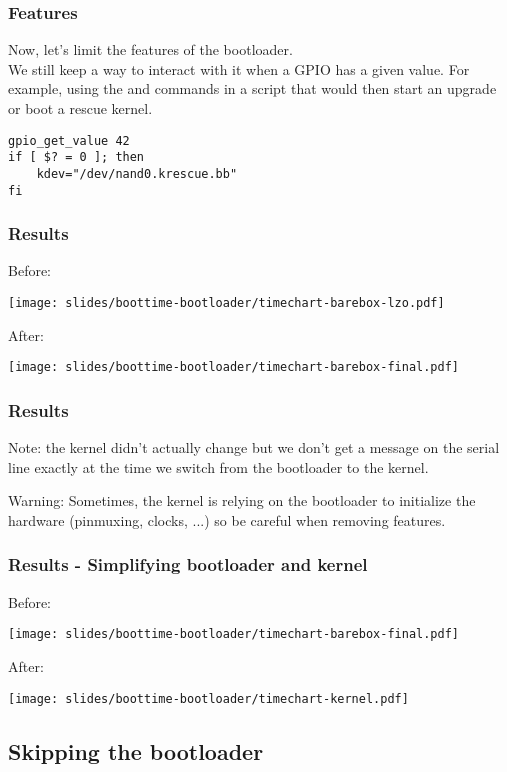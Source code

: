 \begin{frame}[fragile]
\frametitle{Features}
Now, let's limit the features of the bootloader.\\
We still keep a way to interact with it when a GPIO has a given value.
For example, using the  and
 commands in a script that would then start an
upgrade or boot a rescue kernel.
\begin{block}{}
\begin{verbatim}
gpio_get_value 42
if [ $? = 0 ]; then
    kdev="/dev/nand0.krescue.bb"
fi
\end{verbatim}
\end{block}
\end{frame}

\begin{frame}
\frametitle{Results}
Before:
\begin{center}
    \texttt{[image: slides/boottime-bootloader/timechart-barebox-lzo.pdf]}
\end{center}
After:
\begin{center}
    \texttt{[image: slides/boottime-bootloader/timechart-barebox-final.pdf]}
\end{center}
\end{frame}

\begin{frame}
\frametitle{Results}
Note: the kernel didn't actually change but we don't get a message on
the serial line exactly at the time we switch from the bootloader to
the kernel.

Warning: Sometimes, the kernel is relying on the bootloader to
initialize the hardware (pinmuxing, clocks, ...) so be careful when
removing features.
\end{frame}

\begin{frame}
\frametitle{Results - Simplifying bootloader and kernel}
Before:
\begin{center}
    \texttt{[image: slides/boottime-bootloader/timechart-barebox-final.pdf]}
\end{center}
After:
\begin{center}
    \texttt{[image: slides/boottime-bootloader/timechart-kernel.pdf]}
\end{center}
\end{frame}

\subsection{Skipping the bootloader}

